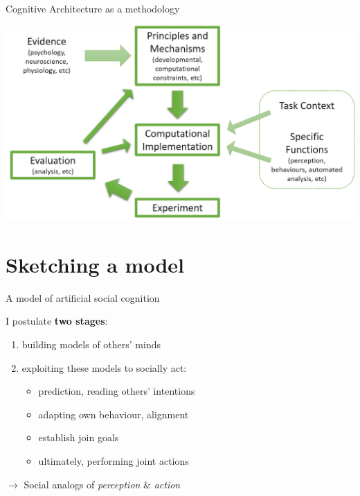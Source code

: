 \documentclass[handout,compress]{beamer}
\begin{document}
{
\begin{frame}{Cognitive Architecture as a methodology}

    \begin{center}
        \includegraphics[width=\linewidth]{cogarch-methodology}
    \end{center}

\end{frame}
}


\section{Sketching a model}


\begin{frame}{A model of artificial social cognition}

    I postulate {\bf two stages}:

    \begin{enumerate}
        \item building models of others' minds
        \item exploiting these models to socially act:
            \begin{itemize}
                \item prediction, reading others' intentions
                \item adapting own behaviour, alignment
                \item establish join goals
                \item ultimately, performing joint actions
            \end{itemize}
    \end{enumerate}

    \vspace{2em}
    $\rightarrow$ Social analogs of \emph{perception} \& \emph{action}

\end{frame}
\end{document}
